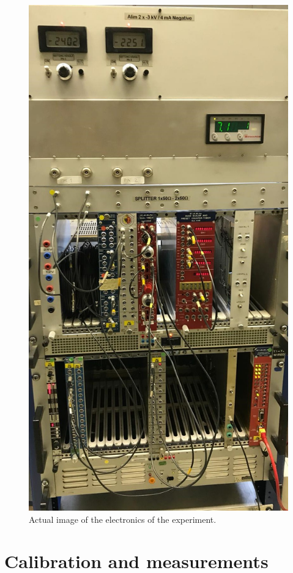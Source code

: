 \documentclass[10pt,swedish, openany]{book}
\begin{document}
\begin{figure}[H]
\includegraphics[scale=0.3]{electronics.jpeg}
\centering
\caption{Actual image of the electronics of the experiment.}
\label{fig:electronicsActual}
\end{figure}

\chapter{Calibration and measurements}
\label{chapter:Calibration}
\end{document}
